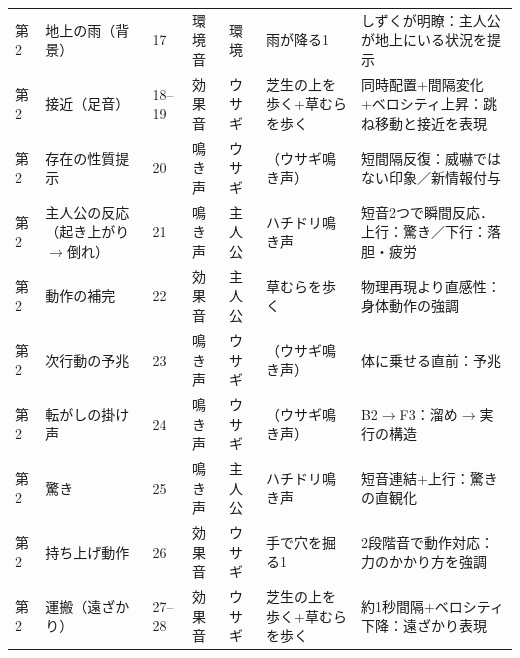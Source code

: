 \begin{longtable}{p{0.6cm} p{2.8cm} p{1.6cm} p{1.5cm} p{1.5cm} p{3.0cm} p{4.1cm}}
	第2          & 地上の雨（背景）             & 17                      & 環境音         & 環境            & 雨が降る1                                     & しずくが明瞭：主人公が地上にいる状況を提示                        \\
	第2          & 接近（足音）               & 18--19                  & 効果音         & ウサギ           & 芝生の上を歩く+草むらを歩く                            & 同時配置+間隔変化+ベロシティ上昇：跳ね移動と接近を表現                 \\
	第2          & 存在の性質提示              & 20                      & 鳴き声         & ウサギ           & （ウサギ鳴き声）                                  & 短間隔反復：威嚇ではない印象／新情報付与                         \\
	第2          & 主人公の反応（起き上がり$\to$倒れ） & 21                      & 鳴き声         & 主人公           & ハチドリ鳴き声                                   & 短音2つで瞬間反応．上行：驚き／下行：落胆・疲労                     \\
	第2          & 動作の補完                & 22                      & 効果音         & 主人公           & 草むらを歩く                                    & 物理再現より直感性：身体動作の強調                            \\
	第2          & 次行動の予兆               & 23                      & 鳴き声         & ウサギ           & （ウサギ鳴き声）                                  & 体に乗せる直前：予兆                                   \\
	第2          & 転がしの掛け声              & 24                      & 鳴き声         & ウサギ           & （ウサギ鳴き声）                                  & B2$\to$F3：溜め$\to$実行の構造                       \\
	第2          & 驚き                   & 25                      & 鳴き声         & 主人公           & ハチドリ鳴き声                                   & 短音連結+上行：驚きの直観化                               \\
	第2          & 持ち上げ動作               & 26                      & 効果音         & ウサギ           & 手で穴を掘る1                                   & 2段階音で動作対応：力のかかり方を強調                          \\
	第2          & 運搬（遠ざかり）             & 27--28                  & 効果音         & ウサギ           & 芝生の上を歩く+草むらを歩く                            & 約1秒間隔+ベロシティ下降：遠ざかり表現                         \\


\end{longtable}
